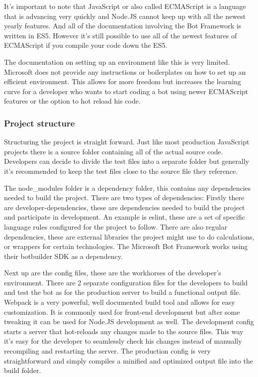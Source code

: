 It's important to note that JavaScript or also called ECMAScript is a language that is advancing very quickly and Node.JS cannot keep up with all the newest yearly features. And all of the documentation involving the Bot Framework is written in ES5. However it's still possible to use all of the newest features of ECMAScript if you compile your code down the ES5.

The documentation on setting up an environment like this is very limited. Microsoft does not provide any instructions or boilerplates on how to set up an efficient environment. This allows for more freedom but increases the learning curve for a developer who wants to start coding a bot using newer ECMAScript features or the option to hot reload his code.

\subsubsection{Project structure}

Structuring the project is straight forward. Just like most production JavaScript projects there is a source folder containing all of the actual source code. Developers can decide to divide the test files into a separate folder but generally it's recommended to keep the test files close to the source file they reference.

The node\_modules folder is a dependency folder, this contains any dependencies needed to build the project. There are two types of dependencies: Firstly there are developer-dependencies, these are dependencies needed to build the project and participate in development. An example is eslint, these are a set of specific language rules configured for the project to follow. There are also regular dependencies, these are external libraries the project might use to do calculations, or wrappers for certain technologies. The Microsoft Bot Framework works using their botbuilder SDK as a dependency.

Next up are the config files, these are the workhorses of the developer's environment. There are 2 separate configuration files for the developers to build and test the bot as for the production server to build a functional output file. Webpack is a very powerful, well documented build tool and allows for easy customization. It is commonly used for front-end development but after some tweaking it can be used for Node.JS development as well. The development config starts a server that hot-reloads any changes made to the source files. This way it's easy for the developer to seamlessly check his changes instead of manually recompiling and restarting the server. The production config is very straightforward and simply compiles a minified and optimized output file into the build folder.

